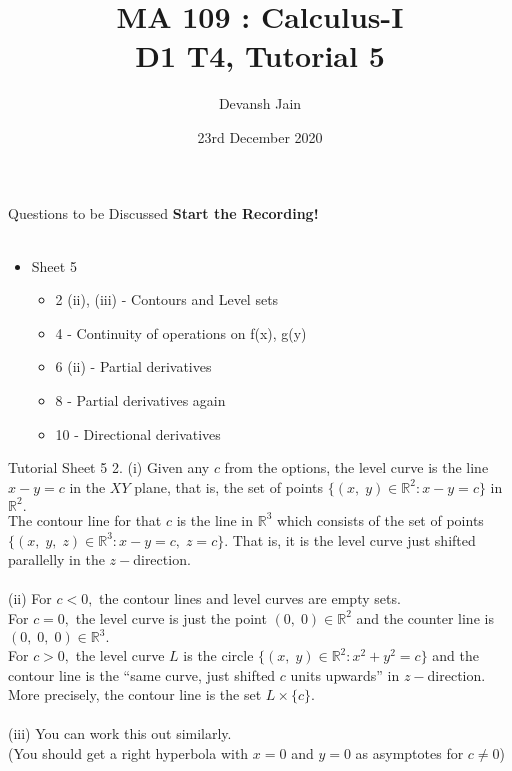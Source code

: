 \documentclass[aspectratio=169]{beamer}
\title{MA 109 : Calculus-I\\ D1 T4, Tutorial 5}
\author{Devansh Jain}
\date[23-12-2020]{23rd December 2020}
\institute[IITB]{IIT Bombay}
\begin{document}
\begin{frame}
    \titlepage
\end{frame}

\begin{frame}{Questions to be Discussed}
    \center\textbf{Start the Recording!} \\~\\
    \begin{itemize}
        \item Sheet 5
            \begin{itemize}
                \item 2 (ii), (iii) - Contours and Level sets
                \item 4 - Continuity of operations on f(x), g(y)
                \item 6 (ii) - Partial derivatives
                \item 8 - Partial derivatives again
                \item 10 - Directional derivatives
            \end{itemize}
    \end{itemize}
\end{frame}

\begin{frame}{Tutorial Sheet 5}
	2. (i) Given any $c$ from the options, the level curve is the line $x - y = c$ in the $XY$ plane, that is, the set of points $\{(x,\;y) \in \mathbb{R}^2 : x - y = c\}$ in $\mathbb{R}^2.$ \\
	The contour line for that $c$ is the line in $\mathbb{R}^3$ which consists of the set of points $\{(x,\;y,\;z)\in\mathbb{R}^3 : x - y = c,\;z = c\}.$ That is, it is the level curve just shifted parallelly in the $z-$direction. \\~\\
	(ii) For $c < 0,$ the contour lines and level curves are empty sets. \\
	For $c = 0,$ the level curve is just the point $(0,\;0)\in \mathbb{R}^2$ and the counter line is $(0,\;0,\;0)\in \mathbb{R}^3.$ \\
	For $c > 0,$ the level curve $L$ is the circle $\{(x,\;y)\in\mathbb{R}^2:x^2 + y^2 = c\}$ and the contour line is the ``same curve, just shifted $c$ units upwards'' in $z-$direction. More precisely, the contour line is the set $L \times \{c\}.$ \\~\\
	(iii) You can work this out similarly. \\
	(You should get a right hyperbola with $x = 0$ and $y = 0$ as asymptotes for $c \ne 0$) \\
\end{frame}
	
\end{document}
